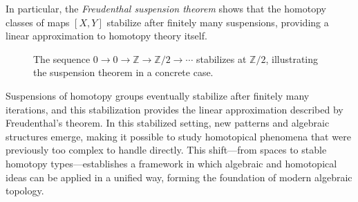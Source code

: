 \documentclass[11pt]{article}
\begin{document}
In particular, the {\it Freudenthal suspension theorem} shows that the homotopy classes of maps $[X,Y]$ stabilize after finitely many suspensions, providing a linear approximation to homotopy theory itself.
\begin{figure}[h]
\centering
{}
\captionsetup{font=footnotesize}
\caption{
The sequence $0 \to 0 \to \mathbb{Z} \to \mathbb{Z}/2 \to \cdots$ stabilizes at $\mathbb{Z}/2$, illustrating the suspension theorem in a concrete case.
}
\end{figure}

Suspensions of homotopy groups eventually stabilize after finitely many iterations, and this stabilization provides the linear approximation described by Freudenthal’s theorem.
In this stabilized setting, new patterns and algebraic structures emerge, making it possible to study homotopical phenomena that were previously too complex to handle directly.
This shift—from spaces to stable homotopy types—establishes a framework in which algebraic and homotopical ideas can be applied in a unified way, forming the foundation of modern algebraic topology.
\end{document}
